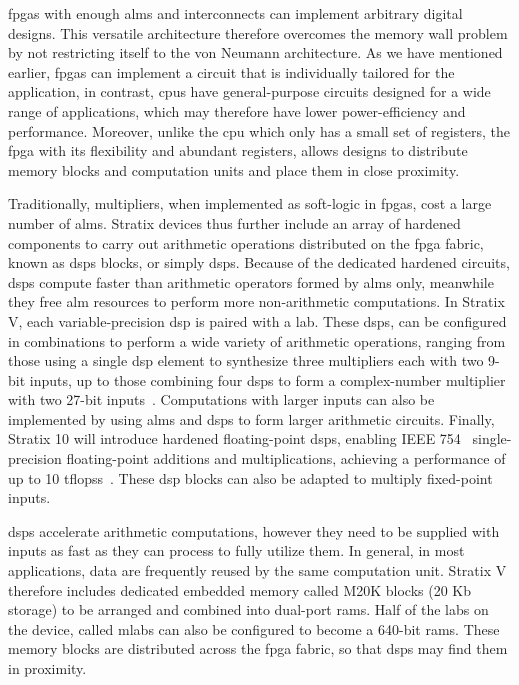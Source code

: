 
\Glspl{fpga} with enough \glspl{alm} and interconnects can implement arbitrary
digital designs.  This versatile architecture therefore overcomes the memory
wall problem by not restricting itself to the von Neumann architecture.  As
we have mentioned earlier, \glspl{fpga} can implement a circuit that is
individually tailored for the application, in contrast, \glspl{cpu} have
general-purpose circuits designed for a wide range of applications, which may
therefore have lower power-efficiency and performance.  Moreover, unlike the
\gls{cpu} which only has a small set of registers, the \gls{fpga} with its
flexibility and abundant registers, allows designs to distribute memory blocks
and computation units and place them in close proximity.

Traditionally, multipliers, when implemented as soft-logic in \glspl{fpga},
cost a large number of \glspl{alm}.  Stratix devices thus further include an
array of hardened components to carry out arithmetic operations distributed
on the \gls{fpga} fabric, known as \glspl{dsp} blocks, or simply \glspl{dsp}.
Because of the dedicated hardened circuits, \glspl{dsp} compute faster
than arithmetic operators formed by \glspl{alm} only, meanwhile they free
\gls{alm} resources to perform more non-arithmetic computations.  In Stratix
V, each variable-precision \gls{dsp} is paired with a \gls{lab}\@.  These
\glspl{dsp}, can be configured in combinations to perform a wide variety
of arithmetic operations, ranging from those using a single \gls{dsp}
element to synthesize three multipliers each with two 9-bit inputs, up
to those combining four \glspl{dsp} to form a complex-number multiplier
with two 27-bit inputs~\cite{stratix5}.  Computations with larger inputs
can also be implemented by using \glspl{alm} and \glspl{dsp} to form
larger arithmetic circuits.  Finally, Stratix 10 will introduce hardened
floating-point \glspl{dsp}, enabling IEEE 754~\cite{ieee754} single-precision
floating-point additions and multiplications, achieving a performance of up
to 10 \glspl{tflops}~\cite{stratix10fp}.  These \gls{dsp} blocks can also be
adapted to multiply fixed-point inputs.

\Glspl{dsp} accelerate arithmetic computations, however they need to be
supplied with inputs as fast as they can process to fully utilize them.
In general, in most applications, data are frequently reused by the same
computation unit.  Stratix V therefore includes dedicated embedded memory
called M20K blocks (20 Kb storage) to be arranged and combined into dual-port
\glspl{ram}.  Half of the \glspl{lab} on the device, called \glspl{mlab} can
also be configured to become a 640-bit \glspl{ram}.  These memory blocks are
distributed across the \gls{fpga} fabric, so that \glspl{dsp} may find them in
proximity.


